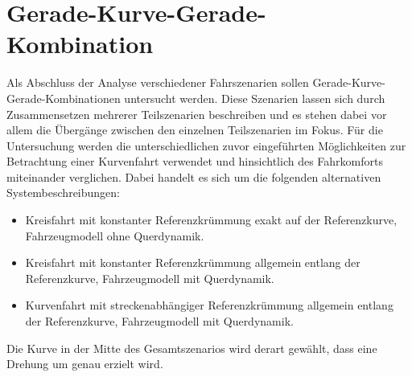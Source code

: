 \section{Gerade-Kurve-Gerade-Kombination}
Als Abschluss der Analyse verschiedener Fahrszenarien sollen Gerade-Kurve-Gerade-Kombinationen untersucht werden. Diese Szenarien lassen sich durch Zusammensetzen mehrerer Teilszenarien beschreiben und es stehen dabei vor allem die Übergänge zwischen den einzelnen Teilszenarien im Fokus. Für die Untersuchung werden die unterschiedlichen zuvor eingeführten Möglichkeiten zur Betrachtung einer Kurvenfahrt verwendet und hinsichtlich des Fahrkomforts miteinander verglichen. Dabei handelt es sich um die folgenden alternativen Systembeschreibungen: 
\begin{itemize}
	\item Kreisfahrt mit konstanter Referenzkrümmung exakt auf der Referenzkurve, Fahrzeugmodell ohne Querdynamik.
	\item Kreisfahrt mit konstanter Referenzkrümmung allgemein entlang der Referenzkurve, Fahrzeugmodell mit Querdynamik.
	\item Kurvenfahrt mit streckenabhängiger Referenzkrümmung allgemein entlang der Referenzkurve, Fahrzeugmodell mit Querdynamik.
\end{itemize}
Die Kurve in der Mitte des Gesamtszenarios wird derart gewählt, dass eine Drehung um genau  erzielt wird.